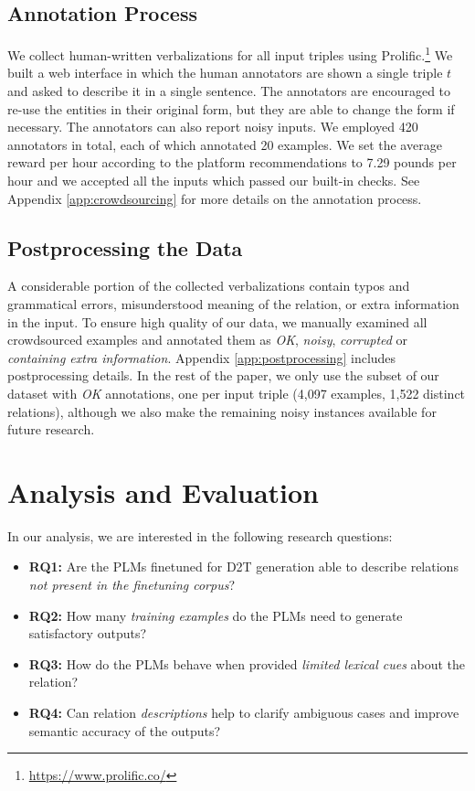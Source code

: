 \subsection{Annotation Process}
We collect human-written verbalizations for all input triples using Prolific.\footnote{\url{https://www.prolific.co/}} We built a web interface in which the human annotators are shown a single triple $t$ and asked to describe it in a single sentence. The annotators are encouraged to re-use the entities in their original form, but they are able to change the form if necessary. The annotators can also report noisy inputs. We employed 420 annotators in total, each of which annotated 20 examples. We set the average reward per hour according to the platform recommendations to  7.29 pounds per hour and we accepted all the inputs which passed our built-in checks. See Appendix \ref{app:crowdsourcing} for more details on the annotation process.


\subsection{Postprocessing the Data}
A considerable portion of the collected verbalizations contain typos and grammatical errors, misunderstood meaning of the relation, or extra information in the input. To ensure high quality of our data, we manually examined all crowdsourced examples and annotated them as \textit{OK}, \textit{noisy}, \textit{corrupted} or \textit{containing extra information}.
Appendix \ref{app:postprocessing} includes postprocessing details.
In the rest of the paper, we only use the subset of our dataset with \textit{OK} annotations, one per input triple (4,097 examples, 1,522 distinct relations), although we also make the remaining noisy instances available for future research.


\section{Analysis and Evaluation}
In our analysis, we are interested in the following research questions:
\begin{itemize}
    \item \textbf{RQ1:} Are the PLMs finetuned for D2T generation able to describe relations \textit{not present in the finetuning corpus}?
    \item \textbf{RQ2:} How many \textit{training examples} do the PLMs need to generate satisfactory outputs?
    \item \textbf{RQ3:} How do the PLMs behave when provided \textit{limited lexical cues} about the relation?
    \item \textbf{RQ4:} Can relation \textit{descriptions} help to clarify ambiguous cases and improve semantic accuracy of the outputs?
\end{itemize}

